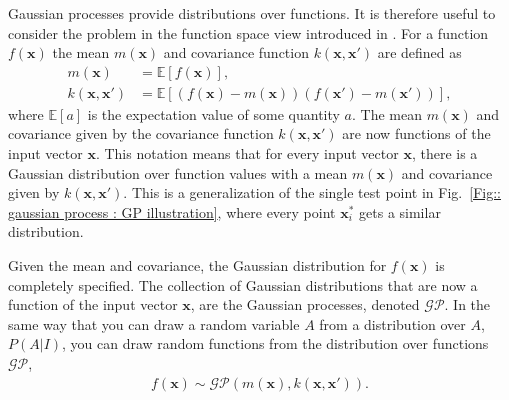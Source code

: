 \documentclass[twoside,english]{uiofysmaster}
\begin{document}
Gaussian processes provide distributions over functions. It is therefore useful to consider the problem in the function space view introduced in \cite{rasmussen2006gaussian}. For a function $f(\textbf{x})$ the mean  $m(\textbf{x})$ and covariance function $k(\textbf{x}, \textbf{x}')$ are defined as
\begin{align}
m(\textbf{x}) &= \mathbb{E}[f(\textbf{x})],\\
k(\textbf{x}, \textbf{x}') &= \mathbb{E} [(f(\textbf{x}) - m(\textbf{x}))(f(\textbf{x}') - m(\textbf{x}'))],
\end{align}
where $\mathbb{E}[a]$ is the expectation value of some quantity $a$. The mean $m(\textbf{x})$ and covariance given by the covariance function $k(\textbf{x}, \textbf{x}')$ are now functions of the input vector $\textbf{x}$. This notation means that for every input vector $\textbf{x}$, there is a Gaussian distribution over function values with a mean $m(\textbf{x})$ and covariance given by $k(\textbf{x}, \textbf{x}')$. This is a generalization of the single test point in Fig.~\ref{Fig:: gaussian process : GP illustration}, where every point $\textbf{x}^*_i$ gets a similar distribution.

Given the mean and covariance, the Gaussian distribution for $f(\textbf{x})$ is completely specified. The collection of Gaussian distributions that are now a function of the input vector $\textbf{x}$, are the Gaussian processes, denoted $\mathcal{GP}$. In the same way that you can draw a random variable $A$ from a distribution over $A$, $P(A|I)$, you can draw random functions from the distribution over functions $\mathcal{GP}$,
\begin{align}
f(\textbf{x}) \sim \mathcal{GP}(m(\textbf{x}), k(\textbf{x}, \textbf{x}')).
\end{align}
\end{document}
